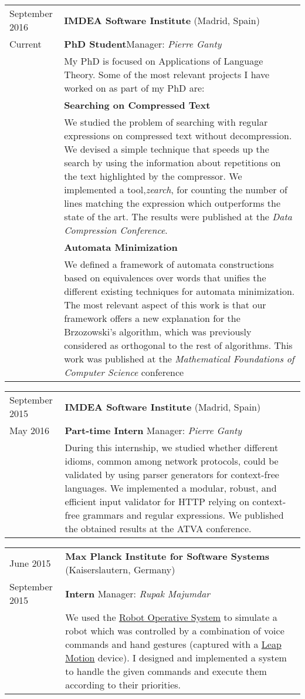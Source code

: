 \documentclass[a4paper,10pt]{article} %
\begin{document}
\begin{tabular}{p{2.6cm}p{12.5cm}}
September 2016 & \textbf{IMDEA Software Institute} (Madrid, Spain) \\
Current & \textcolor{azureblue}{\textbf{PhD Student}}\hfill Manager: \emph{Pierre Ganty}\\

& My PhD is focused on Applications of Language Theory.
Some of the most relevant projects I have worked on as part of my PhD are:\\
[3pt]
& \textcolor{battleshipgrey}{\textbf{Searching on Compressed Text}} \\
[2pt]
& We studied the problem of searching with regular expressions on compressed text without decompression. We devised a simple technique that speeds up the search by using the information about repetitions on the text highlighted by the compressor.
We implemented a tool,\emph{zearch}, for counting the number of lines matching the expression which outperforms the state of the art.
The results were published at the \emph{Data Compression Conference}. \\
[3pt]
& \textcolor{battleshipgrey}{\textbf{Automata Minimization}} \\
[2pt]
& We defined a framework of automata constructions based on equivalences over words that unifies the different existing techniques for automata minimization.
The most relevant aspect of this work is that our framework offers a new explanation for the Brzozowski's algorithm, which was previously considered as orthogonal to the rest of algorithms.
This work was published at the \emph{Mathematical Foundations of Computer Science} conference
\end{tabular}

\begin{tabular}{p{2.6cm}p{12.5cm}}
September 2015 & \textbf{IMDEA Software Institute} (Madrid, Spain) \\
May 2016 & \textcolor{azureblue}{\textbf{Part-time Intern}} \hfill Manager: \emph{Pierre Ganty} \\
& During this internship, we studied whether different idioms, common among network protocols, could be validated by using parser generators for context-free languages.
We implemented a modular, robust, and efficient input validator for HTTP relying on context-free grammars and regular expressions.
We published the obtained results at the ATVA conference. 
\end{tabular}

\begin{tabular}{p{2.6cm}p{12.5cm}}
June 2015 & \textbf{Max Planck Institute for Software Systems} (Kaiserslautern, Germany) \\
September 2015 & \textcolor{azureblue}{\textbf{Intern}} \hfill Manager: \emph{Rupak Majumdar} \\
& We used the \href{https://www.ros.org/}{Robot Operative System} to simulate a robot which was controlled by a combination of voice commands and hand gestures (captured with a \href{https://www.leapmotion.com/}{Leap Motion} device).
I designed and implemented a system to handle the given commands and execute them according to their priorities.
\end{tabular}
\end{document}
